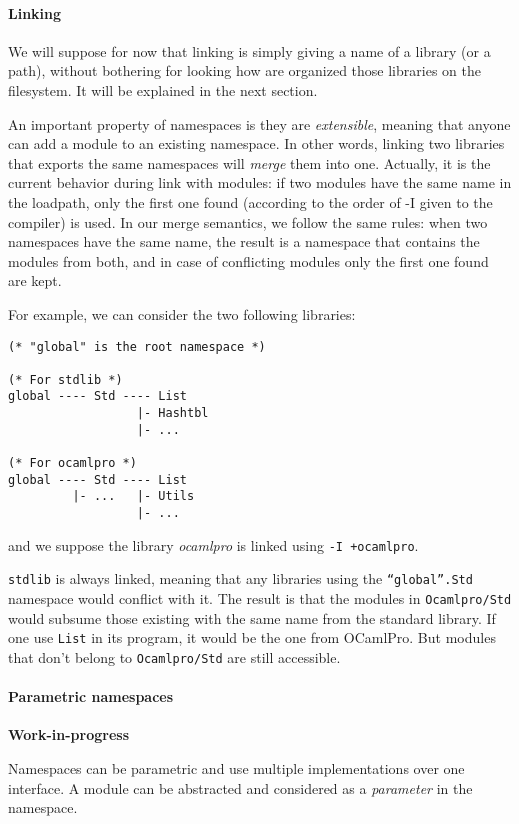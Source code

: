 \documentclass[11pt,a4paper]{article}
\begin{document}
\paragraph{Linking} We will suppose for now that linking is simply giving a name
of a library (or a path), without bothering for looking how are organized those
libraries on the filesystem. It will be explained in the next section.

An important property of namespaces is they are \emph{extensible}, meaning that
anyone can add a module to an existing namespace. In other words, linking two
libraries that exports the same namespaces will \emph{merge} them into
one. Actually, it is the current behavior during link with modules: if two
modules have the same name in the loadpath, only the first one found (according
to the order of -I given to the compiler) is used. In our merge semantics, we
follow the same rules: when two namespaces have the same name, the result is a
namespace that contains the modules from both, and in case of conflicting
modules only the first one found are kept.

For example, we can consider the two following libraries:

\begin{verbatim}
(* "global" is the root namespace *)

(* For stdlib *)
global ---- Std ---- List
                  |- Hashtbl
                  |- ...

(* For ocamlpro *)
global ---- Std ---- List
         |- ...   |- Utils
                  |- ...
\end{verbatim}
and we suppose the library \emph{ocamlpro} is linked using \texttt{-I +ocamlpro}.

\texttt{stdlib} is always linked, meaning that any libraries using the
\texttt{``global''.Std} namespace would conflict with it. The result is that the
modules in \texttt{Ocamlpro/Std} would subsume those existing with the same name
from the standard library. If one use \texttt{List} in its program, it would
be the one from OCamlPro. But modules that don't belong to \texttt{Ocamlpro/Std}
are still accessible.


\paragraph{Parametric namespaces}

\textbf{Work-in-progress}

Namespaces can be parametric and use multiple implementations over one
interface. A module can be abstracted and considered as a \emph{parameter} in
the namespace. 
\end{document}
